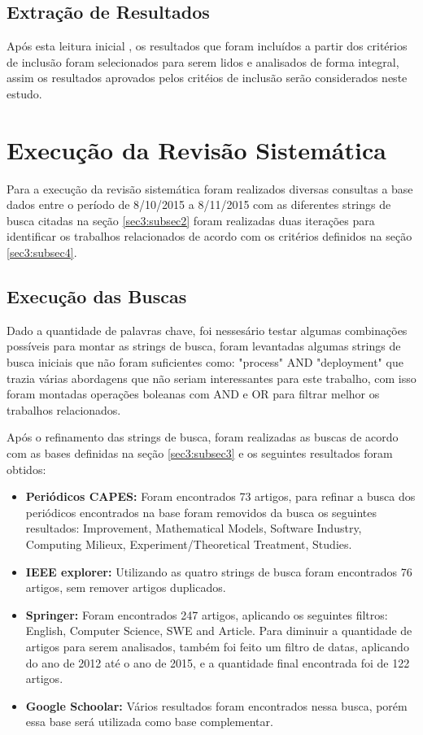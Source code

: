 \documentclass[12pt]{article}
\begin{document}
\subsection{Extração de Resultados} \label{sec3:subsec6}

Após  esta leitura inicial ,  os  resultados que foram incluídos a partir dos critérios de inclusão foram  selecionados  para  serem  lidos e  analisados de forma integral, assim os resultados aprovados pelos critéios de inclusão serão considerados neste estudo.

\section{Execução da Revisão Sistemática} \label{sec4}

Para a execução da revisão sistemática foram realizados diversas consultas a base dados entre o período de  8/10/2015 a 8/11/2015 com as diferentes strings de busca citadas na seção \ref{sec3:subsec2} foram realizadas duas iterações para identificar os trabalhos relacionados de acordo com os critérios definidos na seção \ref{sec3:subsec4}.

\subsection{Execução das Buscas} \label{sec4:subsec1}

Dado a quantidade de palavras chave, foi nessesário testar algumas combinações possíveis para montar as strings de busca, foram levantadas algumas strings de busca iniciais que não foram suficientes como: "process" AND "deployment" que trazia várias abordagens que não seriam interessantes para este trabalho, com isso foram montadas operações boleanas com AND e OR para filtrar melhor os trabalhos relacionados.

Após o refinamento das strings de busca, foram realizadas as buscas de acordo com as bases definidas na seção \ref{sec3:subsec3} e os seguintes resultados foram obtidos:

 \begin{itemize}
   \item  \textbf{Periódicos CAPES:} Foram encontrados 73 artigos, para refinar a busca dos periódicos encontrados na base foram removidos da busca os seguintes resultados: Improvement, Mathematical Models, Software Industry, Computing Milieux, Experiment/Theoretical Treatment, Studies.
   \item  \textbf{IEEE explorer:} Utilizando as quatro strings de busca foram encontrados 76 artigos, sem remover artigos duplicados.
   \item  \textbf{Springer:} Foram encontrados 247 artigos, aplicando os seguintes filtros: English, Computer Science, SWE and Article. Para diminuir a quantidade de artigos para serem analisados, também foi feito um filtro de datas, aplicando do ano de 2012 até o ano de 2015, e a quantidade final encontrada foi de 122 artigos.
   \item  \textbf{Google Schoolar:} Vários resultados foram encontrados nessa busca, porém essa base será utilizada como base complementar.
 \end{itemize}
\end{document}
